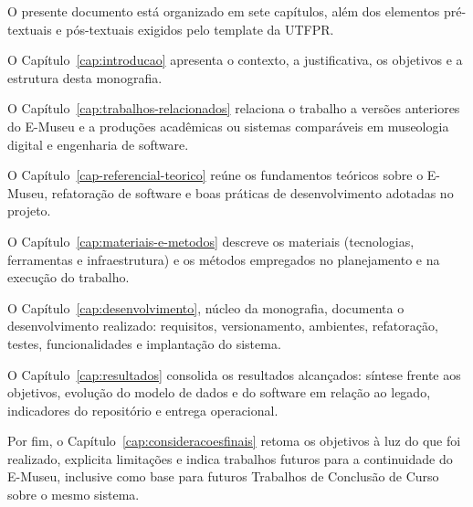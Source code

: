 O presente documento está organizado em sete capítulos, além dos elementos pré-textuais e pós-textuais exigidos pelo template da UTFPR.

O Capítulo~\ref{cap:introducao} apresenta o contexto, a justificativa, os objetivos e a estrutura desta monografia.

O Capítulo~\ref{cap:trabalhos-relacionados} relaciona o trabalho a versões anteriores do E-Museu e a produções acadêmicas ou sistemas comparáveis em museologia digital e engenharia de software.

O Capítulo~\ref{cap-referencial-teorico} reúne os fundamentos teóricos sobre o E-Museu, refatoração de software e boas práticas de desenvolvimento adotadas no projeto.

O Capítulo~\ref{cap:materiais-e-metodos} descreve os materiais (tecnologias, ferramentas e infraestrutura) e os métodos empregados no planejamento e na execução do trabalho.

O Capítulo~\ref{cap:desenvolvimento}, núcleo da monografia, documenta o desenvolvimento realizado: requisitos, versionamento, ambientes, refatoração, testes, funcionalidades e implantação do sistema.

O Capítulo~\ref{cap:resultados} consolida os resultados alcançados: síntese frente aos objetivos, evolução do modelo de dados e do software em relação ao legado, indicadores do repositório e entrega operacional.

Por fim, o Capítulo~\ref{cap:consideracoesfinais} retoma os objetivos à luz do que foi realizado, explicita limitações e indica trabalhos futuros para a continuidade do E-Museu, inclusive como base para futuros Trabalhos de Conclusão de Curso sobre o mesmo sistema.
